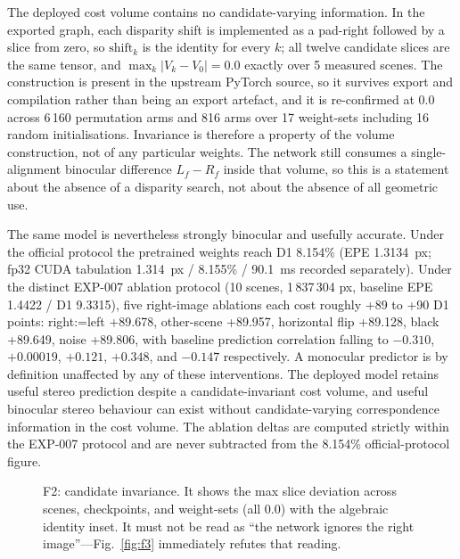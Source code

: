 \documentclass[conference]{IEEEtran}
\begin{document}
The deployed cost volume contains no candidate-varying information. In the exported graph, each disparity shift is implemented as a pad-right followed by a slice from zero, so $\mathrm{shift}_k$ is the identity for every $k$; all twelve candidate slices are the same tensor, and $\max_k |V_k - V_0| = 0.0$ exactly over 5 measured scenes. The construction is present in the upstream PyTorch source, so it survives export and compilation rather than being an export artefact, and it is re-confirmed at 0.0 across 6\,160 permutation arms and 816 arms over 17 weight-sets including 16 random initialisations. Invariance is therefore a property of the volume construction, not of any particular weights. The network still consumes a single-alignment binocular difference $L_f - R_f$ inside that volume, so this is a statement about the absence of a disparity search, not about the absence of all geometric use.

The same model is nevertheless strongly binocular and usefully accurate. Under the official protocol the pretrained weights reach D1 8.154\% (EPE 1.3134~px; fp32 CUDA tabulation 1.314~px / 8.155\% / 90.1~ms recorded separately). Under the distinct EXP-007 ablation protocol (10 scenes, 1\,837\,304 px, baseline EPE 1.4422 / D1 9.3315), five right-image ablations each cost roughly +89 to +90 D1 points: right:=left +89.678, other-scene +89.957, horizontal flip +89.128, black +89.649, noise +89.806, with baseline prediction correlation falling to $-0.310$, $+0.00019$, $+0.121$, $+0.348$, and $-0.147$ respectively. A monocular predictor is by definition unaffected by any of these interventions. The deployed model retains useful stereo prediction despite a candidate-invariant cost volume, and useful binocular stereo behaviour can exist without candidate-varying correspondence information in the cost volume. The ablation deltas are computed strictly within the EXP-007 protocol and are never subtracted from the 8.154\% official-protocol figure.

\begin{figure}[t]
\centering
{}
\caption{F2: candidate invariance. It shows the max slice deviation across scenes, checkpoints, and weight-sets (all 0.0) with the algebraic identity inset. It must not be read as ``the network ignores the right image''---Fig.~\ref{fig:f3} immediately refutes that reading.}
\label{fig:f2}
\end{figure}
\end{document}
